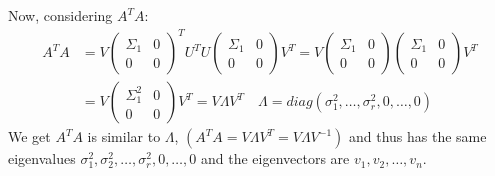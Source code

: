 Now, considering $A^TA$:
\[ 
    \begin{aligned}
        A^TA &= V \begin{pmatrix} \Sigma_1 & 0 \\ 0 & 0 \end{pmatrix}^T U^T U\begin{pmatrix} \Sigma_1 & 0 \\ 0 & 0 \end{pmatrix} V^T = V \begin{pmatrix} \Sigma_1 & 0 \\ 0 & 0 \end{pmatrix} \begin{pmatrix} \Sigma_1 & 0 \\ 0 & 0 \end{pmatrix} V^T\\
        &= V \begin{pmatrix} \Sigma_1^2 & 0 \\ 0 & 0 \end{pmatrix}V^T = V\Lambda V^T \quad \Lambda = diag(\sigma_1^2, \ldots, \sigma_r^2, 0, \ldots, 0)
    \end{aligned}
\]
We get $A^TA$ is similar to $\Lambda$, $(A^TA = V\Lambda V^T = V \Lambda V^{-1})$ and
thus has the same eigenvalues $\sigma_1^2, \sigma_2^2, \ldots, \sigma_r^2, 0, \ldots, 0$ and the eigenvectors are $v_1, v_2, \ldots, v_n$.

